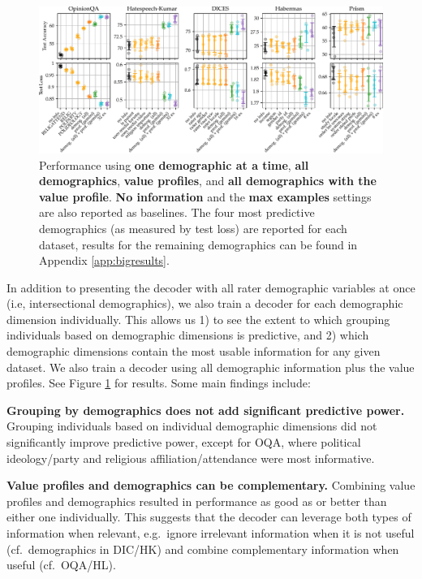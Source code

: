 \documentclass[11pt]{article}
\begin{document}
\begin{figure}[h]
\centering
\includegraphics[width=\textwidth]{files/demographics.pdf}
\caption{Performance using \textcolor{singledemcol}{\bf one demographic at a time}, \textcolor{demcolor}{\bf all demographics}, \textcolor{profcolor}{\bf value profiles}, and \textcolor{bothcol}{\bf all demographics with the value profile}. \textbf{No information} and the \textcolor{excolor}{\bf max examples} settings are also reported as baselines. The four most predictive demographics (as measured by test loss) are reported for each dataset, results for the remaining demographics can be found in Appendix \ref{app:bigresults}.}
\label{fig:demographicresults}
\end{figure}

In addition to presenting the decoder with all rater demographic variables at once (i.e, intersectional demographics), we also train a decoder for each demographic dimension individually. This allows us 1) to see the extent to which grouping individuals based on demographic dimensions is predictive, and 2) which demographic dimensions contain the most usable information for any given dataset. We also train a decoder using all demographic information plus the value profiles. See Figure \ref{fig:demographicresults} for results.
Some main findings include:

\textbf{Grouping by demographics does not add significant predictive power.} Grouping individuals based on individual demographic dimensions did not significantly improve predictive power, except for OQA, where political ideology/party and religious affiliation/attendance were most informative.

\textbf{Value profiles and demographics can be complementary.} Combining value profiles and demographics resulted in performance as good as or better than either one individually. This suggests that the decoder can leverage both types of information when relevant, e.g.\ ignore irrelevant information when it is not useful (cf.\ demographics in DIC/HK) and combine complementary information when useful (cf.\ OQA/HL).
\end{document}
